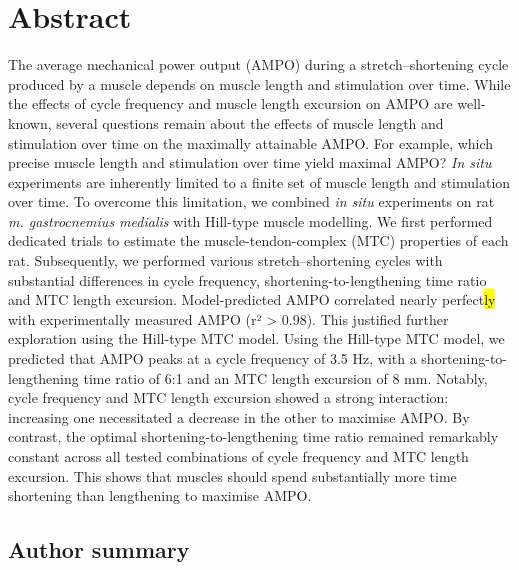 \documentclass[
  10pt,
  letterpaper,
]{article}
\begin{document}
\section*{Abstract}
The average mechanical power output (AMPO) during a stretch--shortening
cycle produced by a muscle depends on muscle length and stimulation over
time. While the effects of cycle frequency and muscle length excursion
on AMPO are well-known, several questions remain about the effects of
muscle length and stimulation over time on the maximally attainable
AMPO. For example, which precise muscle length and stimulation over time
yield maximal AMPO? \emph{In situ} experiments are inherently limited to
a finite set of muscle length and stimulation over time. To overcome
this limitation, we combined \emph{in situ} experiments on rat \emph{m.
gastrocnemius medialis} with Hill-type muscle modelling. We first
performed dedicated trials to estimate the muscle-tendon-complex (MTC)
properties of each rat. Subsequently, we performed various
stretch--shortening cycles with substantial differences in cycle
frequency, shortening-to-lengthening time ratio and MTC length
excursion. Model-predicted AMPO correlated nearly perfect\hl{ly} with
experimentally measured AMPO (r² \textgreater{} 0.98). This justified
further exploration using the Hill-type MTC model. Using the Hill-type
MTC model, we predicted that AMPO peaks at a cycle frequency of 3.5 Hz,
with a shortening-to-lengthening time ratio of 6:1 and an MTC length
excursion of 8 mm. Notably, cycle frequency and MTC length excursion
showed a strong interaction: increasing one necessitated a decrease in
the other to maximise AMPO. By contrast, the optimal
shortening-to-lengthening time ratio remained remarkably constant across
all tested combinations of cycle frequency and MTC length excursion.
This shows that muscles should spend substantially more time shortening
than lengthening to maximise AMPO.


\linenumbers

\nolinenumbers

\subsection*{Author summary}\label{author-summary}
\end{document}
